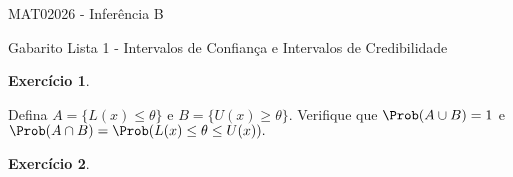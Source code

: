 \documentclass[letter,11pt]{article}
\newtheorem{exer}{Exercício}
\begin{document}
\begin{center}{ \Large MAT02026 - Inferência B }\end{center}

\begin{center}
{\large  \sc Gabarito Lista 1 - Intervalos de Confiança e Intervalos de Credibilidade}
\end{center}
\vspace{5mm}

\begin{exer} \rm
\end{exer}
Defina $A=\{L(x)\leq \theta\}$ e $B=\{U(x)\geq\theta\}$.
Verifique que $\Prob(A\cup B)=1$ e $\Prob(A\cap B)=\Prob(L(x)\leq\theta\leq U(x)).$ 


\begin{exer} \rm
\end{exer}
\end{document}
